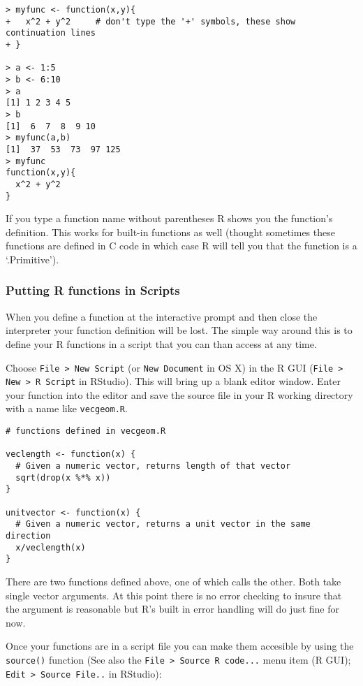 \begin{lstlisting}
> myfunc <- function(x,y){
+   x^2 + y^2     # don't type the '+' symbols, these show continuation lines
+ }

> a <- 1:5
> b <- 6:10
> a
[1] 1 2 3 4 5
> b
[1]  6  7  8  9 10
> myfunc(a,b)
[1]  37  53  73  97 125
> myfunc
function(x,y){
  x^2 + y^2
}
\end{lstlisting}
If you type a function name without parentheses R shows you the
function's definition. This works for built-in functions as well
(thought sometimes these functions are defined in C code in which case R
will tell you that the function is a `.Primitive').

\subsubsection{Putting R functions in Scripts}

When you define a function at the interactive prompt and then close the
interpreter your function definition will be lost. The simple way around
this is to define your R functions in a script that you can than access
at any time.

Choose \lstinline!File > New Script! (or \lstinline!New Document! in OS
X) in the R GUI (\lstinline!File > New > R Script! in RStudio). This
will bring up a blank editor window. Enter your function into the editor
and save the source file in your R working directory with a name like
\lstinline!vecgeom.R!.

\begin{lstlisting}
# functions defined in vecgeom.R

veclength <- function(x) {
  # Given a numeric vector, returns length of that vector
  sqrt(drop(x %*% x))
}

unitvector <- function(x) {
  # Given a numeric vector, returns a unit vector in the same direction
  x/veclength(x)
}
\end{lstlisting}
There are two functions defined above, one of which calls the other.
Both take single vector arguments. At this point there is no error
checking to insure that the argument is reasonable but R's built in
error handling will do just fine for now.

Once your functions are in a script file you can make them accesible by
using the \lstinline!source()! function (See also the
\lstinline!File > Source R code...! menu item (R GUI);
\lstinline!Edit > Source File..! in RStudio):

